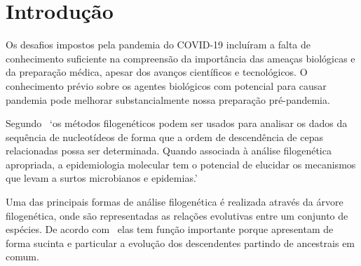 
\chapter{Introdução}

\setlength{\parskip}{0.3cm}



Os desafios impostos pela pandemia do COVID-19 incluíram a falta de conhecimento suficiente na compreensão da importância das ameaças biológicas e da preparação médica, apesar dos avanços científicos e tecnológicos. O conhecimento prévio sobre os agentes biológicos com potencial para causar pandemia pode melhorar substancialmente nossa preparação pré-pandemia.~\cite[p. 1]{behl_threat_2022}

Segundo~\cite[p.1]{barry_phylogenetic_analysis_2006} `os métodos filogenéticos podem ser usados para analisar os dados da sequência de nucleotídeos de forma que a ordem de descendência de cepas relacionadas possa ser determinada. Quando associada à análise filogenética apropriada, a epidemiologia molecular tem o potencial de elucidar os mecanismos que levam a surtos microbianos e epidemias.'

Uma das principais formas de análise filogenética é realizada através da árvore filogenética, onde são representadas as relações evolutivas entre um conjunto de espécies. De acordo com~\cite{morrison_tree_thinking} elas tem função importante porque apresentam de forma sucinta e particular a evolução dos descendentes partindo de ancestrais em comum.

